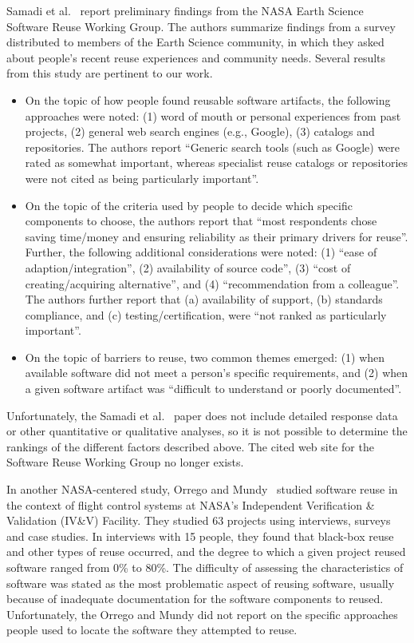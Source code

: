 \documentclass{casicswhitepaper}
\begin{document}
Samadi et al.~\cite{samadi_2004} report preliminary findings from the NASA Earth Science Software Reuse Working Group.  The authors summarize findings from a survey distributed to members of the Earth Science community, in which they asked about people's recent reuse experiences and community needs.  Several results from this study are pertinent to our work.
\begin{itemize}

\item On the topic of how people found reusable software artifacts, the following approaches were noted: (1) word of mouth or personal experiences from past projects, (2) general web search engines (e.g., Google), (3) catalogs and repositories.  The authors report ``Generic search tools (such as Google) were rated as somewhat important, whereas specialist reuse catalogs or repositories were not cited as being particularly important''.

\item On the topic of the criteria used by people to decide which specific components to choose, the authors report that ``most respondents chose saving time/money and ensuring reliability as their primary drivers for reuse''.  Further, the following additional considerations were noted: (1) ``ease of adaption/integration'', (2) availability of source code'', (3) ``cost of creating/acquiring alternative'', and (4) ``recommendation from a colleague''.  The authors further report that (a) availability of support, (b) standards compliance, and (c) testing/certification, were ``not ranked as particularly important''.

\item On the topic of barriers to reuse, two common themes emerged: (1) when available software did not meet a person's specific requirements, and (2) when a given software artifact was ``difficult to understand or poorly documented''.

\end{itemize}
Unfortunately, the Samadi et al.~\cite{samadi_2004} paper does not include detailed response data or other quantitative or qualitative analyses, so it is not possible to determine the rankings of the different factors described above.  The cited web site for the Software Reuse Working Group no longer exists.

In another NASA-centered study, Orrego and Mundy~\cite{orrego_2007_study} studied software reuse in the context of flight control systems at NASA's Independent Verification \& Validation (IV\&V) Facility.  They studied 63 projects using interviews, surveys and case studies.  In interviews with 15 people, they found that black-box reuse and other types of reuse occurred, and the degree to which a given project reused software ranged from 0\% to 80\%.  The difficulty of assessing the characteristics of software was stated as the most problematic aspect of reusing software, usually because of inadequate documentation for the software components to reused.  Unfortunately, the Orrego and Mundy did not report on the specific approaches people used to locate the software they attempted to reuse.
\end{document}
